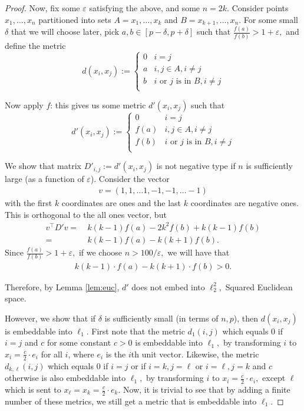 \begin{proof}
  Now, fix some $\varepsilon$ satisfying the above, and some $n = 2k$. Consider points $x_1, \dots, x_n$ partitioned into sets $A = x_1, \ldots, x_k$ and $B= x_{k+1}, \ldots, x_n$. For some small $\delta$ that we will choose later, pick $a, b \in [p-\delta, p+\delta]$ such that $\frac{f(a)}{f(b)} > 1+\varepsilon,$ and define the metric
  \[d(x_i, x_j) :=
    \begin{cases}
    0 & i = j \\
    a & i,j\in A, i \neq j\\
    b & i \text{ or } j \text{ is in } B, i \neq j\\
    \end{cases}
  \]
  
    Now apply $f$: this gives us some metric $d'(x_i, x_j)$ such that
  \[d'(x_i, x_j) :=
    \begin{cases}
    0 & i = j \\
    f(a) & i,j\in A, i \neq j\\
    f(b) & i \text{ or } j \text{ is in } B, i \neq j\\
    \end{cases}
  \]
  
  We show that matrix $D'_{i, j} := d'(x_i, x_j)$ is not negative type if $n$ is sufficiently large (as a function of $\varepsilon$).
  Consider the vector 
  \begin{align*}
   v = (1, 1, \ldots 1, -1, -1, \ldots -1) 
  \end{align*}
  with the first $k$ coordinates are ones and the last $k$ coordinates are negative ones. This is orthogonal to the all ones
  vector, but 
  \begin{align*}
    v^{\top} D' v 
    = & ~ k(k-1)f(a) - 2k^2f(b) + k(k-1) f(b) \\
    = & ~ k(k-1) f(a) - k(k+1) f(b).
 \end{align*}
  Since $\frac{f(a)}{f(b)} > 1+\varepsilon,$ if we choose $n > 100/\varepsilon,$ we will have that
  \begin{align*}
  k(k-1) \cdot f(a) - k(k+1) \cdot f(b) > 0.
  \end{align*}
  
  Therefore, by Lemma \ref{lem:euc}, $d'$ does not embed into $\ell_2^2,$ Squared Euclidean space.
  
  However, we show that if $\delta$ is sufficiently small (in terms of $n, p$), then $d(x_i, x_j)$ is embeddable into $\ell_1$. First note that the metric $d_1(i, j)$ which equals $0$ if $i = j$ and $c$ for some constant $c > 0$ is embeddable into $\ell_1,$ by transforming $i$ to $x_i = \frac{c}{2} \cdot e_i$ for all $i$, where $e_i$ is the $i$th unit vector. Likewise, the metric $d_{k, \ell}(i, j)$ which equals $0$ if $i = j$ or if $i = k, j = \ell$ or $i = \ell, j = k$ and $c$ otherwise is also embeddable into $\ell_1,$ by transforming $i$ to $x_i = \frac{c}{2} \cdot e_i,$ except $\ell$ which is sent to $x_\ell = x_k = \frac{c}{2} \cdot e_k$. Now, it is trivial to see that by adding a finite number of these metrics, we still get a metric that is embeddable into $\ell_1$. 
  

\end{proof}
